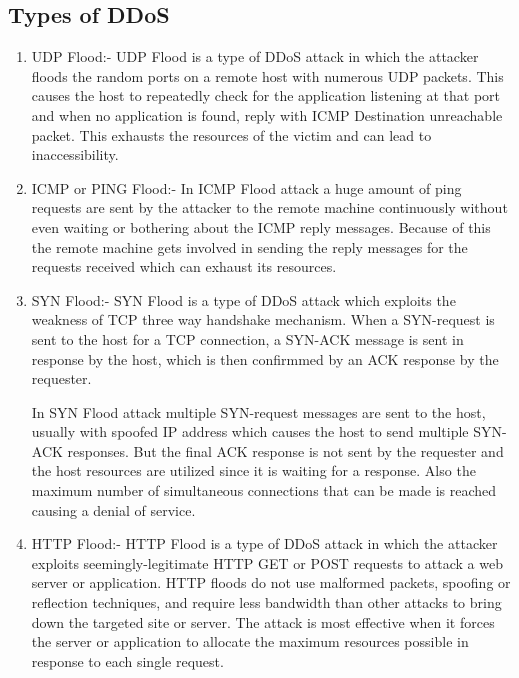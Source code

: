 \documentclass[12pt,a4paper,final]{report}
\begin{document}
\subsection{Types of DDoS}
\begin{enumerate}
\item
UDP Flood:-
\newline
UDP Flood is a type of DDoS attack in which the attacker floods the random ports on a remote host with numerous UDP packets. This causes the host to repeatedly check for the application listening at that port and when no application is found, reply with ICMP Destination unreachable packet. This exhausts the resources of the victim and can lead to inaccessibility.

\item
ICMP or PING Flood:-
\newline
In ICMP Flood attack a huge amount of ping requests are sent by the attacker to the remote machine continuously without even waiting or bothering about the ICMP reply messages. Because of this the remote machine gets involved in sending the reply messages for the requests received which can exhaust its resources.

\item
SYN Flood:-
\newline
SYN Flood is a type of DDoS attack which exploits the weakness of TCP three way handshake mechanism. When a SYN-request is sent to the host for a TCP connection, a SYN-ACK message is sent in response by the host, which is then confirmmed by an ACK response by the requester.

In SYN Flood attack multiple SYN-request messages are sent to the host, usually with spoofed IP address which causes the host to send multiple SYN-ACK responses. But the final ACK response is not sent by the requester and the host resources are utilized since it is waiting for a response. Also the maximum number of simultaneous connections that can be made is reached causing a denial of service.

\item
HTTP Flood:-
\newline
HTTP Flood is a type of DDoS attack in which the attacker exploits seemingly-legitimate HTTP GET or POST requests to attack a web server or application. HTTP floods do not use malformed packets, spoofing or reflection techniques, and require less bandwidth than other attacks to bring down the targeted site or server. The attack is most effective when it forces the server or application to allocate the maximum resources possible in response to each single request.
\end{enumerate}
\end{document}
